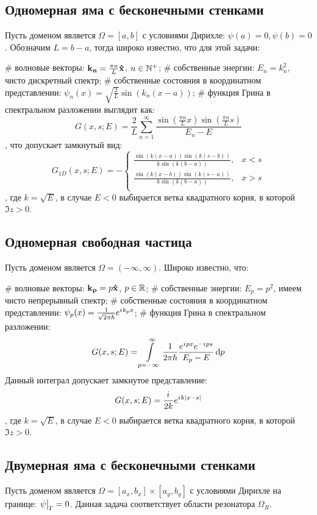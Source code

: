 \subsection{Одномерная яма с бесконечными стенками}
Пусть доменом является $\Omega = [a, b]$ с условиями Дирихле: $\psi(a) = 0, \psi(b) = 0$. Обозначим $L = b - a$, тогда широко известно, что для этой задачи:
\begin{ilist}
# волновые векторы: $\vb{k_n} = \frac{\pi n}{L} \vb{\hat{x}}$, $n \in \mathbb{N}^+$;
# собственные энергии: $E_n = k_n^2$, чисто дискретный спектр;
# собственные состояния в координатном представлении: $\psi_n(x) = \sqrt{\frac{2}{L}} \sin(k_n (x - a))$;
# функция Грина в спектральном разложении выглядит как:
\[
G(x, s; E) = \frac{2}{L} \sum\limits_{n = 1}^\infty \frac{\sin(\frac{\pi n}{L} x) \sin(\frac{\pi n}{L} s)}{E_n - E}
\]
, что допускает замкнутый вид:
\[
G_{1D}(x, s; E) = -\begin{cases}
\frac{\sin(k(x - a)) \sin(k(s - b))}{k \sin(k(b - a))}, & x < s \\
\frac{\sin(k(x - b)) \sin(k(s - a))}{k \sin(k(b - a))}, & x > s \\
\end{cases}
\]
, где $k = \sqrt{E}$, в случае $E < 0$ выбирается ветка квадратного корня, в которой $\Im z > 0$.
\end{ilist}

\subsection{Одномерная свободная частица}
Пусть доменом является $\Omega = (-\infty, \infty)$. Широко известно, что:
\begin{ilist}
# волновые векторы: $\vb{k_{p}} = p \vb{\hat{x}}$, $p \in \mathbb{R}$;
# собственные энергии: $E_p = p^2$, имеем чисто непрерывный спектр;
# собственные состояния в координатном представлении: $\psi_p(x) = \frac{1}{\sqrt{2 \pi \hbar}} e^{{i\mkern1mu} k_p x}$;
# функция Грина в спектральном разложении:
\[
G(x, s; E) = \int\limits_{p = -\infty}^\infty \frac{1}{2 \pi \hbar} \frac{e^{{i\mkern1mu} p x} e^{-{i\mkern1mu} p s}}{E_p - E} \dd{p}
\]
Данный интеграл допускает замкнутое представление:
\[
G(x, s; E) = \frac{{i\mkern1mu}}{2 k} e^{{i\mkern1mu} k |x - s|}
\]
, где $k = \sqrt{E}$, в случае $E < 0$ выбирается ветка квадратного корня, в которой $\Im z > 0$.
\end{ilist}

\subsection{Двумерная яма с бесконечными стенками}
Пусть доменом является $\Omega = [a_x, b_x] \times [a_y, b_y]$ с условиями Дирихле на границе: $\eval{\psi}_{\Gamma} = 0$. Данная задача соответствует области резонатора $\Omega_R$.

